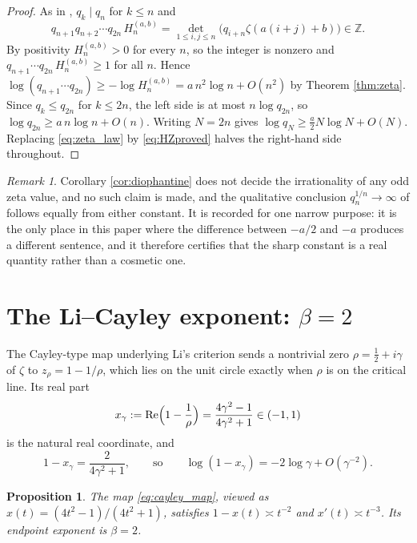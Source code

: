 \documentclass[11pt]{amsart}
\numberwithin{equation}{section}
\theoremstyle{plain}
\newtheorem{proposition}[theorem]{Proposition}
\theoremstyle{definition}
\theoremstyle{remark}
\newtheorem{remark}[theorem]{Remark}
\begin{document}
\begin{proof}
As in \cite{HaynesZudilin2015}, $q_{k}\mid q_{n}$ for $k\le n$ and
\[
q_{n+1}q_{n+2}\cdots q_{2n}\,H_{n}^{(a,b)}=\det_{1\le i,j\le n}\bigl(q_{i+n}\zeta(a(i+j)+b)\bigr)\in\mathbb Z .
\]
By positivity $H_{n}^{(a,b)}>0$ for every $n$, so the integer is nonzero and
$q_{n+1}\cdots q_{2n}\,H_{n}^{(a,b)}\ge1$ for all $n$. Hence
$\log(q_{n+1}\cdots q_{2n})\ge-\log H_{n}^{(a,b)}=a\,n^{2}\log n+O(n^{2})$ by Theorem \ref{thm:zeta}.
Since $q_{k}\le q_{2n}$ for $k\le2n$, the left side is at most $n\log q_{2n}$, so
$\log q_{2n}\ge a\,n\log n+O(n)$. Writing $N=2n$ gives
$\log q_{N}\ge\tfrac a2N\log N+O(N)$. Replacing \eqref{eq:zeta_law} by \eqref{eq:HZproved}
halves the right-hand side throughout.
\end{proof}

\begin{remark}
Corollary \ref{cor:diophantine} does not decide the irrationality of any odd zeta value, and no such
claim is made, and the qualitative conclusion $q_{n}^{1/n}\to\infty$ of \cite{HaynesZudilin2015}
follows equally from either constant. It is recorded for one narrow purpose: it is the only place
in this paper where the difference between $-a/2$ and $-a$ produces a different sentence, and it
therefore certifies that the sharp constant is a real quantity rather than a cosmetic one.
\end{remark}

\section{The Li--Cayley exponent: $\beta=2$}
\label{sec:cayley}

The Cayley-type map underlying Li's criterion \cite{Li1997,BombieriLagarias1999} sends a nontrivial
zero $\rho=\tfrac12+i\gamma$ of $\zeta$ to $z_{\rho}=1-1/\rho$, which lies on the unit circle exactly
when $\rho$ is on the critical line. Its real part
\begin{equation}
x_{\gamma}:=\operatorname{Re}\Bigl(1-\frac1\rho\Bigr)=\frac{4\gamma^{2}-1}{4\gamma^{2}+1}\in(-1,1)
\label{eq:cayley_map}
\end{equation}
is the natural real coordinate, and
\begin{equation}
1-x_{\gamma}=\frac{2}{4\gamma^{2}+1},
\qquad\text{so}\qquad
\log(1-x_{\gamma})=-2\log\gamma+O(\gamma^{-2}).
\label{eq:cayley_endpoint}
\end{equation}

\begin{proposition}
\label{prop:beta2}
The map \eqref{eq:cayley_map}, viewed as $x(t)=(4t^{2}-1)/(4t^{2}+1)$, satisfies
$1-x(t)\asymp t^{-2}$ and $x'(t)\asymp t^{-3}$. Its endpoint exponent is $\beta=2$.
\end{proposition}
\end{document}
